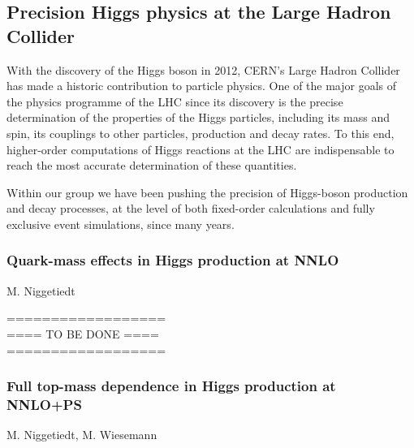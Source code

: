 \documentclass{FBR_Bericht_2025}
\begin{document}
\subsection{Precision Higgs physics at the Large Hadron Collider}
\begin{refsection}
With the discovery of the Higgs boson in 2012, CERN's Large Hadron Collider has made a 
historic contribution to particle physics. One of the major goals of the physics programme
of the LHC since its discovery is the precise determination of the properties of the Higgs
particles, including its mass and spin, its couplings to other particles, production and decay
rates. To this end, higher-order computations of Higgs reactions at the LHC are indispensable
to reach the most accurate determination of these quantities.

Within our group we have been pushing the precision of Higgs-boson production and decay
processes, at the level of both fixed-order calculations and fully exclusive event simulations,
since many years. 

\subsubsection{Quark-mass effects in Higgs production at NNLO}
\begin{Namen}
M. Niggetiedt
\end{Namen}
%
{\color{red} ==================\\ ====\; TO BE DONE\; ====\\ ==================}
%
\subsubsection{Full top-mass dependence in Higgs production at NNLO+PS}
\begin{Namen}
M. Niggetiedt, M. Wiesemann
\end{Namen}


\end{refsection}
\end{document}
